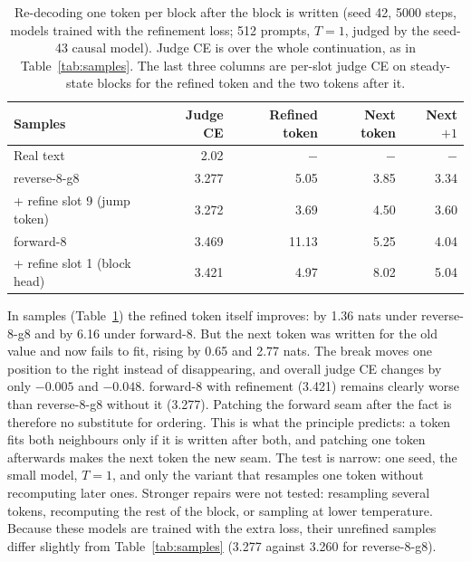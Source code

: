 \documentclass[11pt]{article}
\theoremstyle{definition}
\theoremstyle{remark}
\newcommand{\sch}[1]{\textsf{#1}}
\begin{document}
\begin{table}[t]
  \centering
  \caption{Re-decoding one token per block after the block is written (seed 42, 5000 steps, models trained with the refinement loss; 512 prompts, $T=1$, judged by the seed-43 causal model). Judge CE is over the whole continuation, as in Table~\ref{tab:samples}. The last three columns are per-slot judge CE on steady-state blocks for the refined token and the two tokens after it.}
  \label{tab:refine}
  \small
  \begin{tabular}{lrrrr}
    \toprule
    Samples & Judge CE & Refined token & Next token & Next $+1$ \\
    \midrule
    Real text                                   & 2.02  & $-$   & $-$  & $-$  \\
    \sch{reverse-8-g8}                          & 3.277 & 5.05  & 3.85 & 3.34 \\
    \quad + refine slot 9 (jump token)          & 3.272 & 3.69  & 4.50 & 3.60 \\
    \sch{forward-8}                             & 3.469 & 11.13 & 5.25 & 4.04 \\
    \quad + refine slot 1 (block head)          & 3.421 & 4.97  & 8.02 & 5.04 \\
    \bottomrule
  \end{tabular}
\end{table}

In samples (Table~\ref{tab:refine}) the refined token itself improves: by 1.36 nats under \sch{reverse-8-g8} and by 6.16 under \sch{forward-8}.
But the next token was written for the old value and now fails to fit, rising by 0.65 and 2.77 nats.
The break moves one position to the right instead of disappearing, and overall judge CE changes by only $-0.005$ and $-0.048$.
\sch{forward-8} with refinement (3.421) remains clearly worse than \sch{reverse-8-g8} without it (3.277).
Patching the forward seam after the fact is therefore no substitute for ordering.
This is what the principle predicts: a token fits both neighbours only if it is written after both, and patching one token afterwards makes the next token the new seam.
The test is narrow: one seed, the small model, $T=1$, and only the variant that resamples one token without recomputing later ones.
Stronger repairs were not tested: resampling several tokens, recomputing the rest of the block, or sampling at lower temperature.
Because these models are trained with the extra loss, their unrefined samples differ slightly from Table~\ref{tab:samples} (3.277 against 3.260 for \sch{reverse-8-g8}).
\end{document}
